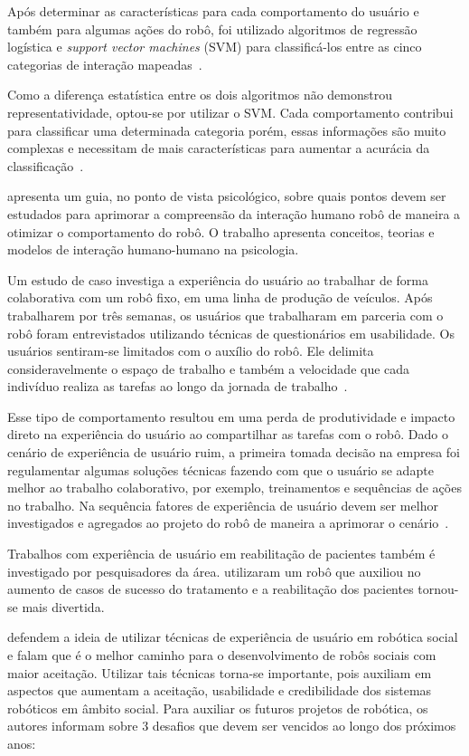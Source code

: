 Após determinar as características para cada comportamento do usuário e também para algumas ações do robô, foi utilizado algoritmos de regressão logística e \emph{support vector machines} (SVM) para classificá-los entre as cinco categorias de interação mapeadas~\cite{jokinen:2015}.

Como a diferença estatística entre os dois algoritmos não demonstrou representatividade, optou-se por utilizar o SVM. Cada comportamento contribui para classificar uma determinada categoria porém, essas informações são muito complexas e necessitam de mais características para aumentar a acurácia da classificação~\cite{jokinen:2015}.

 apresenta um guia, no ponto de vista psicológico, sobre quais pontos devem ser estudados para aprimorar a compreensão da interação humano robô de maneira a otimizar o comportamento do robô. O trabalho apresenta conceitos, teorias e modelos de interação humano-humano na psicologia.

Um estudo de caso investiga a experiência do usuário ao trabalhar de forma colaborativa com um robô fixo, em uma linha de produção de veículos. Após trabalharem por três semanas, os usuários que trabalharam em parceria com o robô foram entrevistados utilizando técnicas de questionários em usabilidade. Os usuários sentiram-se limitados com o auxílio do robô. Ele delimita consideravelmente o espaço de trabalho e também a velocidade que cada indivíduo realiza as tarefas ao longo da jornada de trabalho~\cite{weiss:2016}.

Esse tipo de comportamento resultou em uma perda de produtividade e impacto direto na experiência do usuário ao compartilhar as tarefas com o robô. Dado o cenário de experiência de usuário ruim, a primeira tomada decisão na empresa foi regulamentar algumas soluções técnicas fazendo com que o usuário se adapte melhor ao trabalho colaborativo, por exemplo, treinamentos e sequências de ações no trabalho. Na sequência fatores de experiência de usuário devem ser melhor investigados e agregados ao projeto do robô de maneira a aprimorar o cenário~\cite{weiss:2016}.

Trabalhos com experiência de usuário em reabilitação de pacientes também é investigado por pesquisadores da área.  utilizaram um robô que auxiliou no aumento de casos de sucesso do tratamento e a reabilitação dos pacientes tornou-se mais divertida.

 defendem a ideia de utilizar técnicas de experiência de usuário em robótica social e falam que é o melhor caminho para o desenvolvimento de robôs sociais com maior aceitação. Utilizar tais técnicas torna-se importante, pois auxiliam em aspectos que aumentam a aceitação, usabilidade e credibilidade dos sistemas robóticos em âmbito social. Para auxiliar os futuros projetos de robótica, os autores informam sobre 3 desafios que devem ser vencidos ao longo dos próximos anos:

